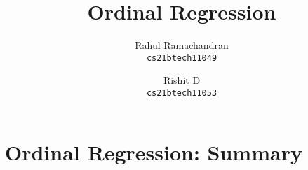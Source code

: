 \documentclass[a4paper, 11pt]{article}
\title{Ordinal Regression}
\author{
  Rahul Ramachandran\\
  \texttt{cs21btech11049}
  \and
  Rishit D\\
  \texttt{cs21btech11053}
}
\begin{document}
\maketitle
\tableofcontents

\section{Ordinal Regression: Summary}



\end{document}
